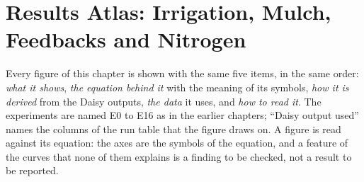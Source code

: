\chapter{Results Atlas: Irrigation, Mulch, Feedbacks and Nitrogen}\label{chap:20}
Every figure of this chapter is shown with the same five items, in the same order: \emph{what it shows}, \emph{the equation behind it} with the meaning of its symbols, \emph{how it is derived} from the Daisy outputs, \emph{the data} it uses, and \emph{how to read it}. The experiments are named E0 to E16 as in the earlier chapters; ``Daisy output used'' names the columns of the run table that the figure draws on. A figure is read against its equation: the axes are the symbols of the equation, and a feature of the curves that none of them explains is a finding to be checked, not a result to be reported.
